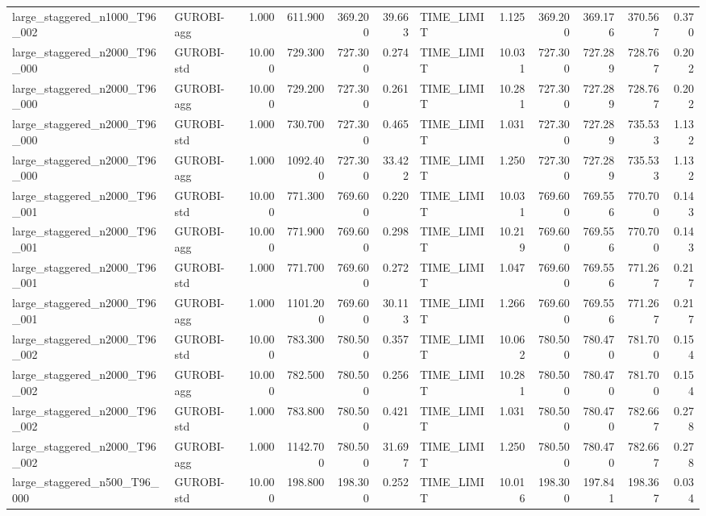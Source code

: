 \begin{table}[htbp]
\begin{tabular}{llrrrrlrrrrr}
large\_staggered\_n1000\_T96\_002 & GUROBI-agg & 1.000 & 611.900 & 369.200 & 39.663 & TIME\_LIMIT & 1.125 & 369.200 & 369.176 & 370.567 & 0.370 \\
large\_staggered\_n2000\_T96\_000 & GUROBI-std & 10.000 & 729.300 & 727.300 & 0.274 & TIME\_LIMIT & 10.031 & 727.300 & 727.289 & 728.767 & 0.202 \\
large\_staggered\_n2000\_T96\_000 & GUROBI-agg & 10.000 & 729.200 & 727.300 & 0.261 & TIME\_LIMIT & 10.281 & 727.300 & 727.289 & 728.767 & 0.202 \\
large\_staggered\_n2000\_T96\_000 & GUROBI-std & 1.000 & 730.700 & 727.300 & 0.465 & TIME\_LIMIT & 1.031 & 727.300 & 727.289 & 735.533 & 1.132 \\
large\_staggered\_n2000\_T96\_000 & GUROBI-agg & 1.000 & 1092.400 & 727.300 & 33.422 & TIME\_LIMIT & 1.250 & 727.300 & 727.289 & 735.533 & 1.132 \\
large\_staggered\_n2000\_T96\_001 & GUROBI-std & 10.000 & 771.300 & 769.600 & 0.220 & TIME\_LIMIT & 10.031 & 769.600 & 769.556 & 770.700 & 0.143 \\
large\_staggered\_n2000\_T96\_001 & GUROBI-agg & 10.000 & 771.900 & 769.600 & 0.298 & TIME\_LIMIT & 10.219 & 769.600 & 769.556 & 770.700 & 0.143 \\
large\_staggered\_n2000\_T96\_001 & GUROBI-std & 1.000 & 771.700 & 769.600 & 0.272 & TIME\_LIMIT & 1.047 & 769.600 & 769.556 & 771.267 & 0.217 \\
large\_staggered\_n2000\_T96\_001 & GUROBI-agg & 1.000 & 1101.200 & 769.600 & 30.113 & TIME\_LIMIT & 1.266 & 769.600 & 769.556 & 771.267 & 0.217 \\
large\_staggered\_n2000\_T96\_002 & GUROBI-std & 10.000 & 783.300 & 780.500 & 0.357 & TIME\_LIMIT & 10.062 & 780.500 & 780.470 & 781.700 & 0.154 \\
large\_staggered\_n2000\_T96\_002 & GUROBI-agg & 10.000 & 782.500 & 780.500 & 0.256 & TIME\_LIMIT & 10.281 & 780.500 & 780.470 & 781.700 & 0.154 \\
large\_staggered\_n2000\_T96\_002 & GUROBI-std & 1.000 & 783.800 & 780.500 & 0.421 & TIME\_LIMIT & 1.031 & 780.500 & 780.470 & 782.667 & 0.278 \\
large\_staggered\_n2000\_T96\_002 & GUROBI-agg & 1.000 & 1142.700 & 780.500 & 31.697 & TIME\_LIMIT & 1.250 & 780.500 & 780.470 & 782.667 & 0.278 \\
large\_staggered\_n500\_T96\_000 & GUROBI-std & 10.000 & 198.800 & 198.300 & 0.252 & TIME\_LIMIT & 10.016 & 198.300 & 197.841 & 198.367 & 0.034 \\

\end{tabular}
\end{table}
